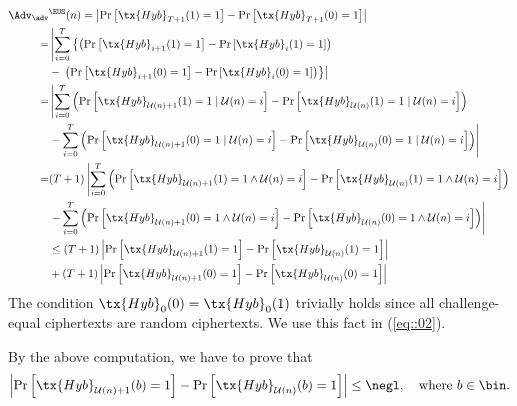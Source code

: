 \documentclass{fundam}
\begin{document}
\begin{align}
	\Adv_{\adv}&^{\EUS}(n) = \left| \Pr\left[ \tx{Hyb}_{T+1}(1)=1 \right]   -  \Pr\left[ \tx{Hyb}_{T+1}(0)=1 \right]   \right| \nonumber\\
	=&\left|  \sum_{i=0}^{T} \left\{   \left(  \Pr\left[   \tx{Hyb}_{i+1}(1)=1 \right]   -   \Pr\left[   \tx{Hyb}_{i}(1)=1 \right] \right) \right. \right. \nonumber\\
	& -   \left.\left. \left(  \Pr\left[   \tx{Hyb}_{i+1}(0)=1 \right]   -   \Pr\left[   \tx{Hyb}_{i}(0)=1 \right] \right)   \right\} \right|    \label{eq::02}\\
	=&\left|  \sum_{i=0}^{T}  \left(  \Pr\left[   \tx{Hyb}_{\mathcal{U}(n)+1}(1)=1 \mid \mathcal{U}(n) = i \right]   -   \Pr\left[   \tx{Hyb}_{\mathcal{U}(n)}(1)=1 \mid \mathcal{U}(n) = i \right] \right) \right. \nonumber \\
	&\left. - \sum_{i=0}^{T}  \left(  \Pr\left[   \tx{Hyb}_{\mathcal{U}(n)+1}(0)=1 \mid \mathcal{U}(n) = i \right]   -   \Pr\left[   \tx{Hyb}_{\mathcal{U}(n)}(0)=1 \mid \mathcal{U}(n) = i \right] \right) \right| \nonumber \\
	= & (T+1)\left|  \sum_{i=0}^{T}  \left(  \Pr\left[   \tx{Hyb}_{\mathcal{U}(n)+1}(1)=1 \land \mathcal{U}(n) = i \right]   -   \Pr\left[   \tx{Hyb}_{\mathcal{U}(n)}(1)=1 \land \mathcal{U}(n) = i \right] \right) \right. \nonumber\\ %
	&\left. - \sum_{i=0}^{T}  \left(  \Pr\left[   \tx{Hyb}_{\mathcal{U}(n)+1}(0)=1 \land \mathcal{U}(n) = i \right]   -   \Pr\left[   \tx{Hyb}_{\mathcal{U}(n)}(0)=1 \land \mathcal{U}(n) = i \right] \right) \right| \nonumber \\
	&\leq (T+1) \left|  \Pr\left[   \tx{Hyb}_{\mathcal{U}(n)+1}(1)=1\right] - \Pr\left[   \tx{Hyb}_{\mathcal{U}(n)}(1)=1  \right]  \right|  \nonumber \\
	&+  (T+1) \left|  \Pr\left[   \tx{Hyb}_{\mathcal{U}(n)+1}(0)=1\right] - \Pr\left[   \tx{Hyb}_{\mathcal{U}(n)}(0)=1  \right]  \right| \nonumber
\end{align}	
The condition $\tx{Hyb}_{0}(0)  =  \tx{Hyb}_{0}(1)$ trivially holds since all challenge-equal ciphertexts are random ciphertexts. We use this fact in (\ref{eq::02}). 

By the above computation, we have to prove that 
\begin{align*}
	\left|  \Pr\left[   \tx{Hyb}_{\mathcal{U}(n)+1}(b)=1\right] - \Pr\left[   \tx{Hyb}_{\mathcal{U}(n)}(b)=1  \right]  \right| \leq \negl, ~~~\text{where}~b\in\bin.
\end{align*} 
\end{document}

